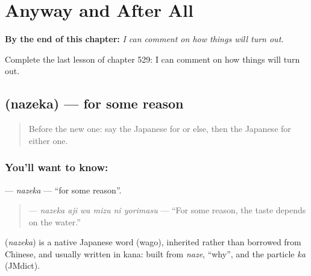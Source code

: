 
\chapter{Anyway and After All}
\label{ch:ja-anyway-and-after-all}

\begin{chapteropening}
\textbf{By the end of this chapter:} \emph{I can comment on how things will turn out.}

Complete the last lesson of chapter 529: I can comment on how things will turn out.
\end{chapteropening}

\section[\texorpdfstring{\ja{なぜか} (nazeka)}{なぜか (nazeka)}]{ (nazeka) — for some reason}

\label{lesson:JA-C529-nazeka}



\begin{quote}
Before the new one: say the Japanese for or else, then the Japanese for either one.
\end{quote}

\subsection*{You'll want to know: }
\textbf{} — \emph{nazeka} — \textquotedblleft{}for some reason\textquotedblright{}.

\begin{quote}
\textbf{   } — \emph{nazeka aji wa mizu ni yorimasu} — \textquotedblleft{}For some reason, the taste depends on the water.\textquotedblright{}
\end{quote}

\begin{cousinweb}
\textbf{} (\emph{nazeka}) is a native Japanese word (wago), inherited rather than borrowed from Chinese, and usually written in kana: built from \emph{naze}, \textquotedblleft{}why\textquotedblright{}, and the particle \emph{ka} (JMdict).
\end{cousinweb}

